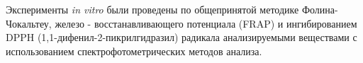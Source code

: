 % 
% 
% 

Эксперименты \emph{in vitro} были проведены по общепринятой методике
Фолина-Чокальтеу, железо - восстанавливающего потенциала (FRAP) и
ингибированием DPPH (1,1-дифенил-2-пикрилгидразил) радикала
анализируемыми веществами с использованием спектрофотометрических
методов анализа.

